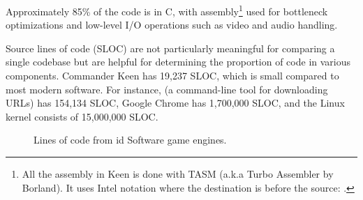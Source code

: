\documentclass[book.tex]{subfiles}
\begin{document}
\par
\begin{minipage}{\textwidth}

\end{minipage}

\par
Approximately 85\% of the code is in C, with assembly\footnote{All the assembly in Keen is done with TASM (a.k.a Turbo Assembler by Borland). It uses Intel notation where the destination is before the source:   .} used for bottleneck optimizations and low-level I/O operations such as video and audio handling. \\

\par
Source lines of code (SLOC) are not particularly meaningful for comparing a single codebase but are helpful for determining the proportion of code in various components. Commander Keen has 19,237 SLOC, which is small compared to most modern software. For instance,  (a command-line tool for downloading URLs) has 154,134 SLOC, Google Chrome has 1,700,000 SLOC, and the Linux kernel consists of 15,000,000 SLOC.\\

\par
\begin{figure}[H]
\centering
   \caption{Lines of code from id Software game engines.}
 \end{figure}
 
\par
\end{document}
